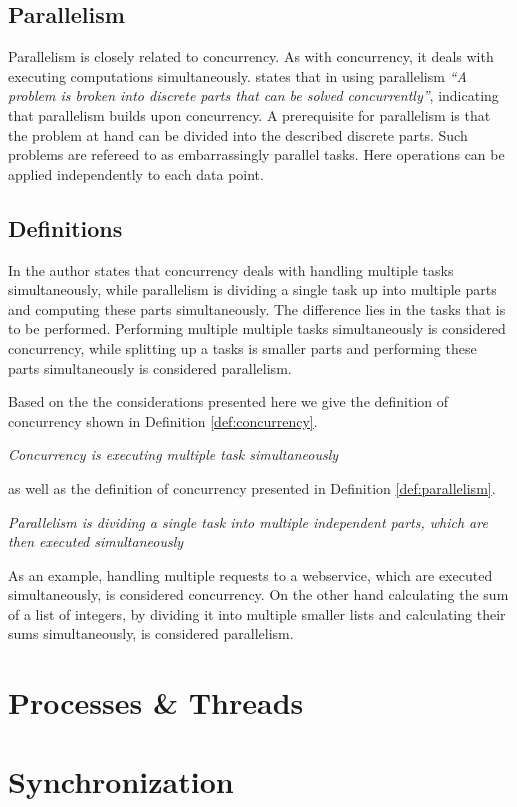 \subsection{Parallelism}\label{sec:basics_parallelism}
Parallelism is closely related to concurrency. As with concurrency, it deals with executing computations simultaneously. \cite{introPar} states that in using parallelism \textit{``A problem is broken into discrete parts that can be solved concurrently''}, indicating that parallelism builds upon concurrency. A prerequisite for parallelism is that the problem at hand can be divided into the described discrete parts. Such problems are refereed to as embarrassingly parallel tasks\cite{sutter2005software}. Here operations can be applied independently to each data point.

\subsection{Definitions}\label{sec:basics_concurrency_parallelism_def}
In \cite[p. 24]{sevenModels} the author states that concurrency deals with handling multiple tasks simultaneously, while parallelism is dividing a single task up into multiple parts and computing these parts simultaneously. The difference lies in the tasks that is to be performed. Performing multiple multiple tasks simultaneously is considered concurrency, while splitting up a tasks is smaller parts and performing these parts simultaneously is considered   parallelism.

Based on the the considerations presented here we give the definition of concurrency shown in Definition \ref{def:concurrency}.

\begin{defn}\label{def:concurrency}
\emph{Concurrency is executing multiple task simultaneously}
\end{defn}
as well as the definition of concurrency presented in Definition \ref{def:parallelism}.

\begin{defn}\label{def:parallelism}
\emph{Parallelism is dividing a single task into multiple independent parts, which are then executed simultaneously}
\end{defn}
As an example, handling multiple requests to a webservice, which are executed simultaneously, is considered concurrency. On the other hand calculating the sum of a list of integers, by dividing it into multiple smaller lists and calculating their sums simultaneously, is considered parallelism.

\section{Processes \& Threads}\label{sec:processes_threads}

\section{Synchronization}\label{sec:synchronization}
\worksheetend
